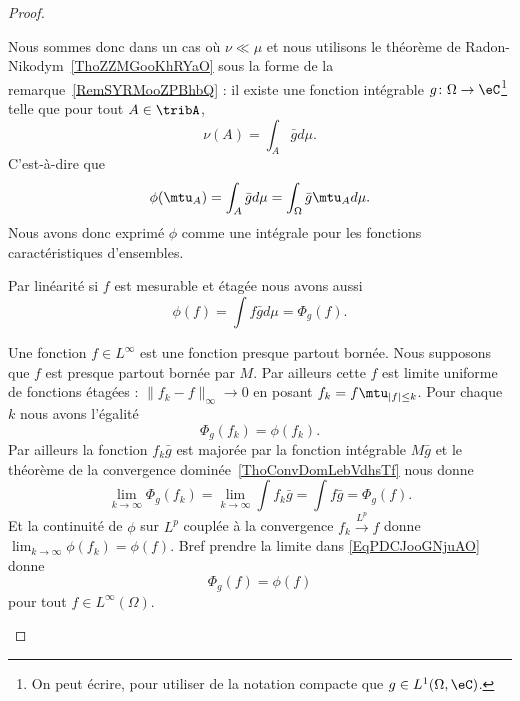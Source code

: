 \begin{proof}
\begin{subproof}

		Nous sommes donc dans un cas où \( \nu\ll\mu\) et nous utilisons le théorème de Radon-Nikodym~\ref{ThoZZMGooKhRYaO} sous la forme de la remarque~\ref{RemSYRMooZPBhbQ} : il existe une fonction intégrable \( g\colon \Omega\to \eC\)\footnote{On peut écrire, pour utiliser de la notation compacte que \(  g\in L^1(\Omega,\eC)\).} telle que pour tout \( A\in\tribA\),
		\begin{equation}
			\nu(A)=\int_A\bar gd\mu.
		\end{equation}
		C'est-à-dire que
		\begin{equation}
			\phi(\mtu_A)=\int_A\bar gd\mu=\int_{\Omega}\bar g\mtu_Ad\mu.
		\end{equation}
		Nous avons donc exprimé \( \phi\) comme une intégrale pour les fonctions caractéristiques d'ensembles.


		Par linéarité si \( f\) est mesurable et étagée nous avons aussi
		\begin{equation}
			\phi(f)=\int f\bar gd\mu=\Phi_g(f).
		\end{equation}


		Une fonction \( f\in L^{\infty}\) est une fonction presque partout bornée. Nous supposons que \( f\) est presque partout bornée par \( M\). Par ailleurs cette \( f\) est limite uniforme de fonctions étagées : \( \| f_k-f \|_{\infty}\to 0\) en posant \( f_k=f\mtu_{| f |\leq k}\). Pour chaque \( k \) nous avons l'égalité
		\begin{equation}    \label{EqPDCJooGNjuAO}
			\Phi_g(f_k)=\phi(f_k).
		\end{equation}
		Par ailleurs la fonction \( f_k\bar g\) est majorée par la fonction intégrable \( M\bar g\) et le théorème de la convergence dominée~\ref{ThoConvDomLebVdhsTf} nous donne
		\begin{equation}
			\lim_{k\to \infty} \Phi_g(f_k)=\lim_{k\to \infty} \int f_k\bar g=\int f\bar g=\Phi_g(f).
		\end{equation}
		Et la continuité de \( \phi\) sur \( L^p\) couplée à la convergence \( f_k\stackrel{L^p}{\longrightarrow}f\) donne \( \lim_{k\to \infty} \phi(f_k)=\phi(f)\). Bref prendre la limite dans \eqref{EqPDCJooGNjuAO} donne
		\begin{equation}
			\Phi_g(f)=\phi(f)
		\end{equation}
		pour tout \( f\in L^{\infty}(\Omega)\).


\end{subproof}
\end{proof}
